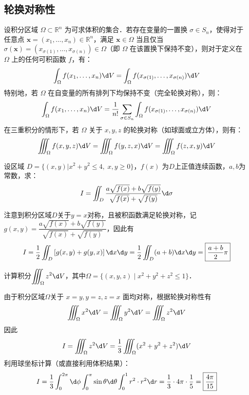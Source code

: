 \documentclass[12pt, a4paper, oneside, UTF8]{ctexbook}
\begin{document}
\subsection{轮换对称性}
\begin{theorem}[变量置换对称性]
    设积分区域 $\Omega \subset \mathbb{R}^n$ 为可求体积的集合．若存在变量的一置换 $\sigma \in S_n$，使得对于任意点 $\bm{x} = (x_1, \dots, x_n) \in \mathbb{R}^n$，满足 $\bm{x} \in \Omega$ 当且仅当 $\sigma(\bm{x}) = (x_{\sigma(1)}, \dots, x_{\sigma(n)}) \in \Omega$（即 $\Omega$ 在该置换下保持不变），则对于定义在 $\Omega$ 上的任何可积函数 $f$，有：
    \[ \int_{\Omega} f(x_1, \dots, x_n) \d V = \int_{\Omega} f(x_{\sigma(1)}, \dots, x_{\sigma(n)}) \d V \]
    特别地，若 $\Omega$ 在自变量的所有排列下均保持不变（完全轮换对称），则：
    \[ \int_{\Omega} f(x_1, \dots, x_n) \d V = \frac{1}{n!} \sum_{\sigma \in S_n} \int_{\Omega} f(x_{\sigma(1)}, \dots, x_{\sigma(n)}) \d V \]
    在三重积分的情形下，若 $\Omega$ 关于 $x, y, z$ 的轮换对称（如球面或立方体），则有：
    \[ \iiint_\Omega f(x,y,z) \d V = \iiint_\Omega f(y,z,x) \d V = \iiint_\Omega f(z,x,y) \d V \]
\end{theorem}

\begin{example}
    设区域 $D=\{(x,y) | x^2+y^2 \le 4,\; x,y \ge 0\}$，$f(x)$ 为$D$上正值连续函数，$a,b$为常数，求：
    \[I=\iint_D\frac{a\sqrt{f(x)}+b\sqrt{f(y)}}{\sqrt{f(x)}+\sqrt{f(y)}} \d \sigma \]
\end{example}
\begin{solution}
    注意到积分区域$D$关于$y=x$对称，且被积函数满足轮换对称，记$g(x,y)=\dfrac{a\sqrt{f(x)}+b\sqrt{f(y)}}{\sqrt{f(x)}+\sqrt{f(y)}}$，因此有
    \[ I = \frac{1}{2}\iint_D \left[ g(x,y) + g(y,x) \right] \d x \d y = \frac{1}{2}\iint_D (a+b) \d x \d y = \boxed{\frac{a+b}{2}\pi} \]
\end{solution}

\begin{example}
    计算积分$\displaystyle\iiint_\Omega z^2\d V$，其中$\Omega = \{(x,y,z) \mid x^2+y^2+z^2 \le 1\}$．
\end{example}
\begin{solution}
    由于积分区域$\Omega$关于 $x=y, y=z, z=x$ 面均对称，根据轮换对称性有
    \[ \iiint_\Omega x^2 \d V = \iiint_\Omega y^2 \d V = \iiint_\Omega z^2 \d V\]
    因此
    \[ I = \iiint_\Omega z^2\d V = \frac{1}{3}\iiint_\Omega (x^2+y^2+z^2) \d V\]
    利用球坐标计算（或直接利用体积结果）：
    \[ I = \frac{1}{3} \int_0^{2\pi} \d\phi \int_0^\pi \sin\theta \d\theta \int_0^1 r^2 \cdot r^2 \d r = \frac{1}{3} \cdot 4\pi \cdot \frac{1}{5} = \boxed{\frac{4\pi}{15}}\]
\end{solution}
\end{document}

